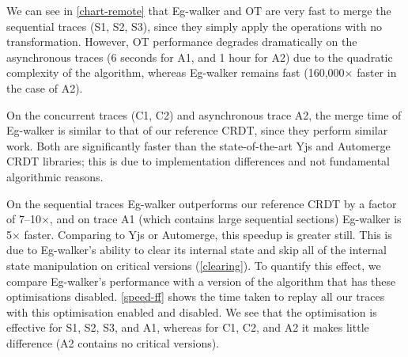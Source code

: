 \documentclass[sigplan,10pt]{acmart}
\newcommand{\algname}{Eg-walker\xspace}
\begin{document}

We can see in \autoref{chart-remote} that \algname and OT are very fast to merge the sequential traces (S1, S2, S3), since they simply apply the operations with no transformation.
However, OT performance degrades dramatically on the asynchronous traces (6 seconds for A1, and 1 hour for A2) due to the quadratic complexity of the algorithm, whereas \algname remains fast (160,000$\times$ faster in the case of A2).

On the concurrent traces (C1, C2) and asynchronous trace A2, the merge time of \algname is similar to that of our reference CRDT, since they perform similar work.
Both are significantly faster than the state-of-the-art Yjs and Automerge CRDT libraries; this is due to implementation differences and not fundamental algorithmic reasons.

On the sequential traces \algname outperforms our reference CRDT by a factor of 7--10$\times$, and on trace A1 (which contains large sequential sections) \algname is 5$\times$ faster.
Comparing to Yjs or Automerge, this speedup is greater still.
This is due to \algname's ability to clear its internal state and skip all of the internal state manipulation on critical versions (\autoref{clearing}).
To quantify this effect, we compare \algname's performance with a version of the algorithm that has these optimisations disabled.
\autoref{speed-ff} shows the time taken to replay all our traces with this optimisation enabled and disabled.
We see that the optimisation is effective for S1, S2, S3, and A1, whereas for C1, C2, and A2 it makes little difference (A2 contains no critical versions).

\end{document}
